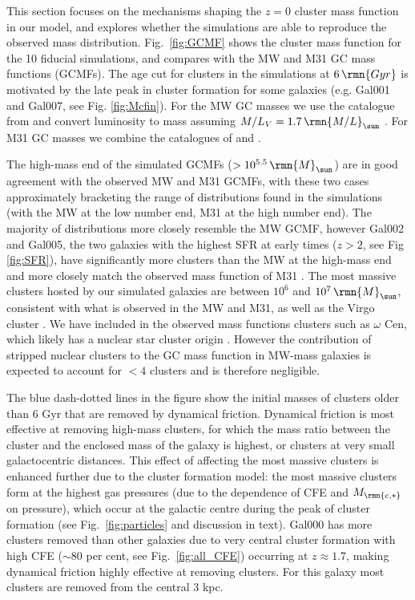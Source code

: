 \documentclass[fleqn,usenatbib]{mnras}
\newcommand\Msun{\,\rmn{M}_{\sun}}
\newcommand\Gyr{\,\rmn{Gyr}}
\newcommand{\Mcstar}{M_\rmn{c,\ast}}
\begin{document}
This section focuses on the mechanisms shaping the $z=0$ cluster mass function in our model, and explores whether the simulations are able to reproduce the observed mass distribution. Fig.~\ref{fig:GCMF} shows the cluster mass function for the 10 fiducial simulations, and compares with the MW and M31 GC mass functions (GCMFs). The age cut for clusters in the simulations at $6 \Gyr$ is motivated by the late peak in cluster formation for some galaxies (e.g. Gal001 and Gal007, see Fig. \ref{fig:Mcfin}). For the MW GC masses we use the catalogue from \citet[2010 edition]{Harris_96} and convert luminosity to mass assuming $M/L_V = 1.7 \, \rmn{M/L}_{\sun}$ \citep[the mean for MW clusters][]{McLaughlin_and_van_der_Marel_05}. For M31 GC masses we combine the catalogues of \citet[using the given masses]{Caldwell_et_al_11} and \citet[again assuming $M/L_V = 1.7 \, \rmn{M/L}_{\sun}$, e.g.~\citealt{Strader_et_al_11}]{Huxor_et_al_14}. 

The high-mass end of the simulated GCMFs ($> 10^{5.5} \Msun$) are in good agreement with the observed MW and M31 GCMFs, with these two cases approximately bracketing the range of distributions found in the simulations (with the MW at the low number end, M31 at the high number end). The majority of distributions more closely resemble the MW GCMF, however Gal002 and Gal005, the two galaxies with the highest SFR at early times ($z>2$, see Fig \ref{fig:SFR}), have significantly more clusters than the MW at the high-mass end and more closely match the observed mass function of M31 \citep[which has nearly three times more clusters than the MW,][]{Huxor_et_al_14}. The most massive clusters hosted by our simulated galaxies are between $10^6$ and $10^7 \Msun$, consistent with what is observed in the MW and M31, as well as the Virgo cluster \citep{Jordan_et_al_07_XII}. 
We have included in the observed mass functions clusters such as $\omega$ Cen, which likely has a nuclear star cluster origin \citep{Lee_et_al_99}. However the contribution of stripped nuclear clusters to the GC mass function in MW-mass galaxies is expected to account for $<4$ clusters \citep{Pfeffer_et_al_14} and is therefore negligible.

The blue dash-dotted lines in the figure show the initial masses of clusters older than 6 Gyr that are removed by dynamical friction. Dynamical friction is most effective at removing high-mass clusters, for which the mass ratio between the cluster and the enclosed mass of the galaxy is highest, or clusters at very small galactocentric distances. This effect of affecting the most massive clusters is enhanced further due to the cluster formation model: the most massive clusters form at the highest gas pressures (due to the dependence of CFE and $\Mcstar$ on pressure), which occur at the galactic centre during the peak of cluster formation (see Fig.~\ref{fig:particles} and discussion in text). Gal000 has more clusters removed than other galaxies due to very central cluster formation with high CFE ($\sim$80 per cent, see Fig.~\ref{fig:all_CFE}) occurring at $z\approx1.7$, making dynamical friction highly effective at removing clusters. For this galaxy most clusters are removed from the central 3 kpc. 
\end{document}
